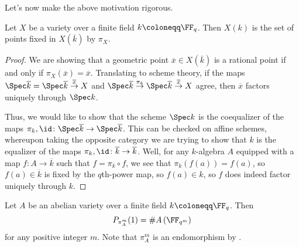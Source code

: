 \documentclass{amsart}
\begin{document}
Let's now make the above motivation rigorous.
\begin{lemma} \label{lem:get-fq-points-from-frob}
	Let $X$ be a variety over a finite field $k\coloneqq\FF_q$. Then $X(k)$ is the set of points fixed in $X(\overline k)$ by $\pi_X$.
\end{lemma}
\begin{proof}
	We are showing that a geometric point $\overline x\in X(\overline k)$ is a rational point if and only if $\pi_X(\overline x)=\overline x$. Translating to scheme theory, if the maps $\Spec\overline k=\Spec\overline k\stackrel{\overline x}\to X$ and $\Spec\overline k\stackrel{\pi_{k}}\to\Spec\overline k\stackrel{\overline x}\to X$ agree, then $\overline x$ factors uniquely through $\Spec k$.

	Thus, we would like to show that the scheme $\Spec k$ is the coequalizer of the maps $\pi_k,{\id}\colon\Spec\overline k\to\Spec\overline k$. This can be checked on affine schemes, whereupon taking the opposite category we are trying to show that $k$ is the equalizer of the maps $\pi_k,{\id}\colon\overline k\to\overline k$. Well, for any $k$-algebra $A$ equipped with a map $f\colon A\to\overline k$ such that $f=\pi_k\circ f$, we see that $\pi_k(f(a))=f(a)$, so $f(a)\in\overline k$ is fixed by the $q$th-power map, so $f(a)\in k$, so $f$ does indeed factor uniquely through $k$.
\end{proof}
\begin{proposition} \label{prop:frob-counts-points}
	Let $A$ be an abelian variety over a finite field $k\coloneqq\FF_q$. Then
	\[P_{\pi_A^m}(1)=\#A\left(\FF_{q^m}\right)\]
	for any positive integer $m$. Note that $\pi_A^m$ is an endomorphism by .
\end{proposition}
\end{document}
